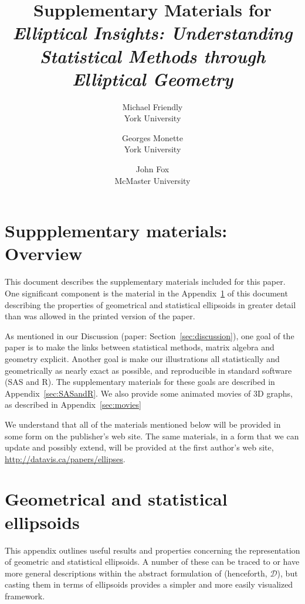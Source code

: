 \documentclass[11pt]{article}%
\newcommand*{\secref}[1]{Section~\ref{#1}}
\newcommand*{\appref}[1]{Appendix~\ref{#1}}
\begin{document}
\begin{titlepage}
\title{Supplementary Materials for \emph{Elliptical Insights: Understanding Statistical Methods through Elliptical Geometry}}
\author{Michael Friendly%
 \\ York University
\and
Georges Monette \\ York University
\and
John Fox \\ McMaster University
}
\end{titlepage}
\maketitle

\section*{Suppplementary materials: Overview}

This document describes the supplementary materials included for this paper.  One significant component
is the material in the \appref{sec:Appendix} of this document describing the properties of geometrical and statistical
ellipsoids in greater detail than was allowed in the printed version of the paper.

As mentioned in our Discussion
(paper: \secref{sec:discussion}), one goal of the paper is to make the links between statistical methods, matrix algebra
and geometry explicit. Another goal is make our illustrations all statistically and geometrically 
as nearly exact as possible, and reproducible in standard software (SAS and R).  The supplementary materials
for these goals are described in \appref{sec:SASandR}.  We also provide some animated movies of 3D
graphs, as described in \appref{sec:movies}

We understand that all of the materials mentioned below will be provided in some form on the publisher's
web site.  The same materials, in a form that we can update and possibly extend, will be provided
at the first author's web site, \url{http://datavis.ca/papers/ellipses}. 

\appendix
{}
\section{Geometrical and statistical ellipsoids}\label{sec:Appendix}
This appendix outlines useful results and properties concerning the representation of geometric and statistical ellipsoids.
A number of these can be traced to or have more general descriptions within the abstract formulation of \citet{Dempster:69}
(henceforth, $\mathcal{D}$),
but casting them in terms of ellipsoids provides a simpler and more easily visualized framework. 




\end{document}
